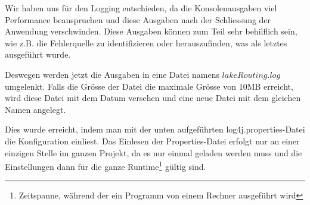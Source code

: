 Wir haben uns für den Logging entschieden, da die Konsolenausgaben viel Performance beanspruchen und diese Ausgaben nach der Schliessung der Anwendung verschwinden. Diese Ausgaben können zum Teil sehr behilflich sein, wie z.B. die Fehlerquelle zu identifizieren oder herauszufinden, was als letztes ausgeführt wurde. 

Deswegen werden jetzt die Ausgaben in eine Datei namens $lakeRouting.log$ umgelenkt. Falls die Grösse der Datei die maximale Grösse von 10MB erreicht, wird diese Datei mit dem Datum versehen und eine neue Datei mit dem gleichen Namen angelegt. 

Dies wurde erreicht, indem man mit der unten aufgeführten log4j.properties-Datei die Konfiguration einliest. Das Einlesen der Properties-Datei erfolgt nur an einer einzigen Stelle im ganzen Projekt, da es nur einmal geladen werden muss und die Einstellungen dann für die ganze Runtime\footnote{Zeitspanne, während der ein Programm von einem Rechner ausgeführt wird} gültig sind.


